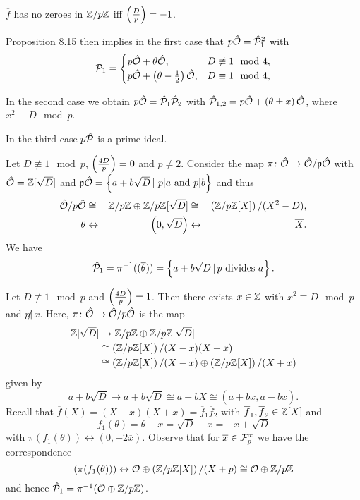 \bigskip $\overline{f}$ has no zeroes in  $\mathbb{Z} / p\mathbb{Z}$ iff $\left(\frac{D}{p}\right) = -1$.

\bigskip Proposition 8.15 then implies in the first case that
$p\hat{\mathcal{O}} = \hat{\mathcal{P}}_1^2$ with 
\[\mathcal{P}_1 = \begin{cases}
p\hat{\mathcal{O}} +\theta \hat{\mathcal{O}}, & D \not \equiv 1 \mod 4, \\
p\hat{\mathcal{O}} + \left( \theta - \frac{1}{2} \right) \hat{\mathcal{O}}, & D \equiv 1 \mod 4, \\
\end{cases}
\]

In the second case we obtain $p \hat{\mathcal{O}} = \hat{\mathcal{P}}_1\hat{\mathcal{P}}_2$ with
$\hat{\mathcal{P}}_{1,2} = p \hat{\mathcal{O}} + \left(\theta \pm x  \right) \hat{\mathcal{O}}$, where $x^2 \equiv D \mod p$.

\bigskip
In the third case $p\hat{\mathcal{P}}$ is a prime ideal.


\begin{Bsp*}
Let $D\not\equiv 1 \mod p$, $\left(\frac{4D}{p}\right) = 0$ and $p \neq 2$. Consider the map
$\pi \colon \hat{\mathcal{O}} \to \hat{\mathcal{O}} / \mathfrak{p}\hat{\mathcal{O}}$
with $\hat{\mathcal{O}} = \mathbb{Z}[\sqrt{D}]$ and $\mathfrak{p} \hat{\mathcal{O}} = \left\{
a+b\sqrt{D} \, | \ p | a \text{ and } p | b \right\}$ and thus
\begin{alignat*}{3}
\hat{\mathcal{O}} / p\hat{\mathcal{O}} 
&\cong& \mathbb{Z} / p\mathbb{Z} \oplus \mathbb{Z} / p\mathbb{Z} [\sqrt{D}] 
&\cong& \left( \mathbb{Z} / p\mathbb{Z} [X] \right) / (X^2-D), \\
\theta 
&\leftrightarrow & \left(0, \sqrt{D}\right)
&\leftrightarrow & \overline{X}.
\end{alignat*}
We have
\[ \hat{\mathcal{P}}_1 = \pi^{-1}((\overline{\theta}))
= \left\{ a+b \sqrt{D} \, | \, p \text{ divides } a \right\}.
\]
\end{Bsp*}

\begin{Bsp*}
Let $D\not\equiv 1 \mod p$ and $\left(\frac{4D}{p}\right) = 1$.
Then there exists $x \in \mathbb{Z}$ with $x^2 \equiv D \mod p$ and $p \not | \, x$.
Here, $\pi \colon \hat{\mathcal{O}} \to \hat{\mathcal{O}} / p\hat{\mathcal{O}}$ is the map
\begin{align*}
\mathbb{Z}[\sqrt{D}] 
&\to \mathbb{Z} / p\mathbb{Z} \oplus \mathbb{Z} / p\mathbb{Z} [\sqrt{D}] \\
&\cong \left( \mathbb{Z} / p\mathbb{Z} [X] \right) / (X-x)(X+x) \\
&\cong \left( \mathbb{Z} / p\mathbb{Z} [X] \right) / (X-x) \oplus \left( \mathbb{Z} / p\mathbb{Z} [X] \right) / (X+x)
\end{align*}
given by
\[ a+b \sqrt{D}
\mapsto \overline{a} + \overline{b} \sqrt{D}
\cong \overline{a} + \overline{b} X
\cong ( \overline{a} + \overline{b} x, \overline{a} - \overline{b} x ).
\]
Recall that $\overline{f}(X)=(X-x)(X+x) = \overline{f}_1 \overline{f}_2$ with $\overline{f}_1, \overline{f}_2 \in \mathbb{Z}[X]$ and
\[ f_1(\theta) = \theta -x = \sqrt{D} -x = -x + \sqrt{D}
\]
with $\pi(f_1(\theta)) \leftrightarrow (0, -2 \overline{x})$.
\bigskip
Observe that for $\overline{x} \in \mathcal{F}_p^x$ we have the correspondence
\[ (\pi(f_1(\theta))) 
\leftrightarrow \mathcal{O} \oplus \left( \mathbb{Z} / p\mathbb{Z} [X] \right) / (X+p)
\cong \mathcal{O} \oplus  \mathbb{Z} / p\mathbb{Z} 
\]
and hence $\hat{\mathcal{P}}_1 = \pi^{-1}(\mathcal{O} \oplus  \mathbb{Z} / p\mathbb{Z}  )$.
\end{Bsp*}


